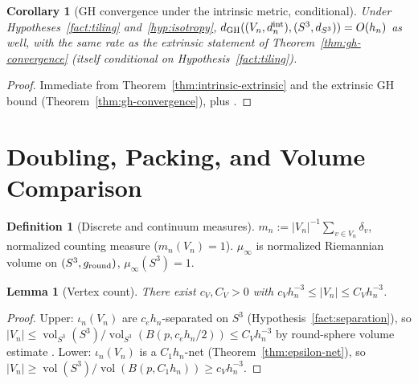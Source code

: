 \documentclass[11pt, a4paper]{amsart}
\newtheorem{lemma}[theorem]{Lemma}
\newtheorem{corollary}[theorem]{Corollary}
\theoremstyle{definition}
\newtheorem{definition}[theorem]{Definition}
\newcommand{\vol}{\operatorname{vol}}
\newcommand{\dGH}{d_{\mathrm{GH}}}
\newcommand{\dsph}{d_{S^3}}
\begin{document}
\begin{corollary}[GH convergence under the intrinsic metric,
  conditional]
\label{cor:gh-intrinsic}
Under Hypotheses~\ref{fact:tiling} and~\ref{hyp:isotropy},
$\dGH((V_n, d_n^{\rm int}), (S^3, \dsph)) = O(h_n)$ as well,
with the same rate as the extrinsic statement
of Theorem~\ref{thm:gh-convergence} (itself conditional on
Hypothesis~\ref{fact:tiling}).
\end{corollary}

\begin{proof}
Immediate from Theorem~\ref{thm:intrinsic-extrinsic} and the
extrinsic GH bound (Theorem~\ref{thm:gh-convergence}), plus
\cite[Cor.~7.3.28]{BuragoBuragoIvanov}.
\end{proof}

\section{Doubling, Packing, and Volume Comparison}
\label{sec:doubling}

\begin{definition}[Discrete and continuum measures]
\label{def:measures}
$m_n := |V_n|^{-1} \sum_{v \in V_n} \delta_v$, normalized counting
measure ($m_n(V_n) = 1$). $\mu_\infty$ is normalized Riemannian
volume on $(S^3, g_{\rm round})$, $\mu_\infty(S^3) = 1$.
\end{definition}

\begin{lemma}[Vertex count]
\label{lem:Vn-count}
There exist $c_V, C_V > 0$ with $c_V h_n^{-3} \leq |V_n| \leq
C_V h_n^{-3}$.
\end{lemma}

\begin{proof}
Upper: $\iota_n(V_n)$ are $c_e h_n$-separated on $S^3$
(Hypothesis~\ref{fact:separation}), so $|V_n| \leq
\vol_{S^3}(S^3)/\vol_{S^3}(B(p, c_e h_n/2)) \leq C_V h_n^{-3}$ by
round-sphere volume estimate \cite[Ch.~III]{BerardSpectralGeometry}.
Lower: $\iota_n(V_n)$ is a $C_1 h_n$-net
(Theorem~\ref{thm:epsilon-net}), so $|V_n| \geq \vol(S^3)/
\vol(B(p, C_1 h_n)) \geq c_V h_n^{-3}$.
\end{proof}
\end{document}
